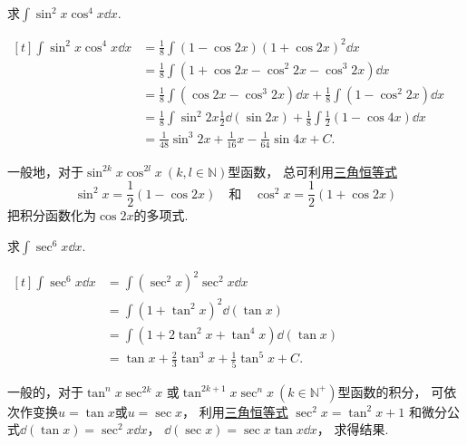 \begin{example}
求\(\int \sin^2 x \cos^4 x \dd{x}\).
\begin{solution}
\(\begin{aligned}[t]
	\int \sin^2 x \cos^4 x \dd{x}
	&= \frac{1}{8} \int (1 - \cos 2x) (1 + \cos 2x)^2 \dd{x} \\
	&= \frac{1}{8} \int (1 + \cos 2x - \cos^2 2x - \cos^3 2x) \dd{x} \\
	&= \frac{1}{8} \int (\cos 2x - \cos^3 2x) \dd{x}
		+ \frac{1}{8} \int (1 - \cos^2 2x) \dd{x} \\
	&= \frac{1}{8} \int \sin^2 2x \frac{1}{2} \dd(\sin 2x)
		+ \frac{1}{8} \int \frac{1}{2} (1 - \cos 4x) \dd{x} \\
	&= \frac{1}{48} \sin^3 2x + \frac{1}{16} x - \frac{1}{64} \sin 4x + C.
\end{aligned}\)
\end{solution}
\end{example}

\begin{remark}
一般地，对于\(\sin^{2k} x \cos^{2l} x\ (k,l\in\mathbb{N})\)型函数，
总可利用\hyperref[equation:三角函数.余弦的二倍角公式1]{三角恒等式}\[
	\sin^2 x = \frac{1}{2} (1 - \cos 2x)
	\quad\text{和}\quad
	\cos^2 x = \frac{1}{2} (1 + \cos 2x)
\]把积分函数化为\(\cos 2x\)的多项式.
\end{remark}

\begin{example}
求\(\int \sec^6x \dd{x}\).
\begin{solution}
\(\begin{aligned}[t]
	\int \sec^6x \dd{x}
	&= \int (\sec^2x)^2 \sec^2x \dd{x} \\
	&= \int (1+\tan^2x)^2 \dd(\tan x) \\
	&= \int (1+2\tan^2x+\tan^4x) \dd(\tan x) \\
	&= \tan x + \frac23 \tan^3x + \frac15 \tan^5x + C.
\end{aligned}\)
\end{solution}
\end{example}

\begin{remark}
一般的，对于\(\tan^n x \sec^{2k} x\)
或\(\tan^{2k+1} x \sec^n x\ (k \in \mathbb{N}^+)\)型函数的积分，
可依次作变换\(u=\tan x\)或\(u=\sec x\)，
利用\hyperref[equation:三角函数.毕达哥拉斯三角恒等式2]{三角恒等式}
\(\sec^2 x = \tan^2 x + 1\)
和微分公式\(\dd(\tan x) = \sec^2 x \dd{x}\)，
\(\dd(\sec x) = \sec x \tan x \dd{x}\)，
求得结果.
\end{remark}


